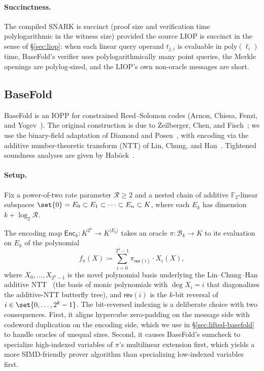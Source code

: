 \documentclass{article}
\theoremstyle{definition}
\newcommand{\BB}{\mathcal{B}}
\newcommand{\FF}[1]{\mathbb{F}_{#1}}
\begin{document}
\paragraph{Succinctness.}
The compiled SNARK is succinct (proof size and verification time polylogarithmic in the witness size) provided the source LIOP is succinct in the sense of \S\ref{sec:liop}: when each linear query operand $t_{j, i}$ is evaluable in $\text{poly}(\ell_i)$ time, BaseFold's verifier uses polylogarithmically many point queries, the Merkle openings are polylog-sized, and the LIOP's own non-oracle messages are short.

\subsection{BaseFold}
\label{sec:basefold}

BaseFold is an IOPP for constrained Reed--Solomon codes (Arnon, Chiesa, Fenzi, and Yogev~\cite[\S 4.1]{Arnon:2025aa}). The original construction is due to Zeilberger, Chen, and Fisch~\cite{Zeilberger:2024aa}; we use the binary-field adaptation of Diamond and Posen~\cite{Diamond:2024ab}, with encoding via the additive number-theoretic transform (NTT) of Lin, Chung, and Han~\cite{Lin:2014aa}. Tightened soundness analyses are given by Haböck~\cite{Habock:2024ab}.

\paragraph{Setup.}
Fix a power-of-two rate parameter $\mathcal{R} \geq 2$ and a nested chain of additive $\FF{2}$-linear subspaces $\set{0} = E_0 \subset E_1 \subset \cdots \subset E_n \subset K$, where each $E_k$ has dimension $k + \log_2 \mathcal{R}$.

The encoding map $\textsf{Enc}_k \colon K^{2^k} \to K^{|E_k|}$ takes an oracle $\pi \colon \BB_k \to K$ to its evaluation on $E_k$ of the polynomial
\[
  f_\pi(X) \coloneqq \sum_{i = 0}^{2^k - 1} \pi_{\textsf{rev}(i)} \cdot X_i(X),
\]
where $X_0, \ldots, X_{2^k - 1}$ is the novel polynomial basis underlying the Lin--Chung--Han additive NTT~\cite{Lin:2014aa} (the basis of monic polynomials with $\deg X_i = i$ that diagonalizes the additive-NTT butterfly tree), and $\textsf{rev}(i)$ is the $k$-bit reversal of $i \in \set{0, \ldots, 2^k - 1}$. The bit-reversed indexing is a deliberate choice with two consequences. First, it aligns hypercube zero-padding on the message side with codeword duplication on the encoding side, which we use in \S\ref{sec:lifted-basefold} to handle oracles of unequal sizes. Second, it causes BaseFold's sumcheck to specialize high-indexed variables of $\pi$'s multilinear extension first, which yields a more SIMD-friendly prover algorithm than specializing low-indexed variables first.
\end{document}
